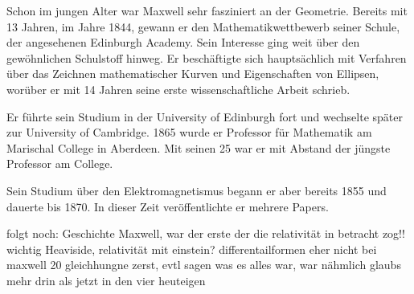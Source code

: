 Schon im jungen Alter war Maxwell sehr fasziniert an der Geometrie. Bereits mit 13 Jahren, im Jahre 1844, gewann er den Mathematikwettbewerb seiner Schule, der angesehenen Edinburgh Academy.
Sein Interesse ging weit über den gewöhnlichen Schulstoff hinweg.
Er beschäftigte sich hauptsächlich mit Verfahren über das Zeichnen mathematischer Kurven und Eigenschaften von Ellipsen, worüber er mit 14 Jahren seine erste wissenschaftliche Arbeit schrieb.

Er führte sein Studium in der University of Edinburgh fort und wechselte später zur University of Cambridge.
1865 wurde er Professor für Mathematik am Marischal College in Aberdeen.
Mit seinen 25 war er mit Abstand der jüngste Professor am College.%

Sein Studium über den Elektromagnetismus begann er aber bereits 1855 und dauerte bis 1870. In dieser Zeit veröffentlichte er mehrere Papers.

 



folgt noch: Geschichte Maxwell, war der erste der die relativität in betracht zog!! wichtig
Heaviside,
relativität mit einstein?
differentailformen eher nicht
bei maxwell 20 gleichhungne zerst, evtl sagen was es alles war, war nähmlich glaubs mehr drin als jetzt in den vier heuteigen




